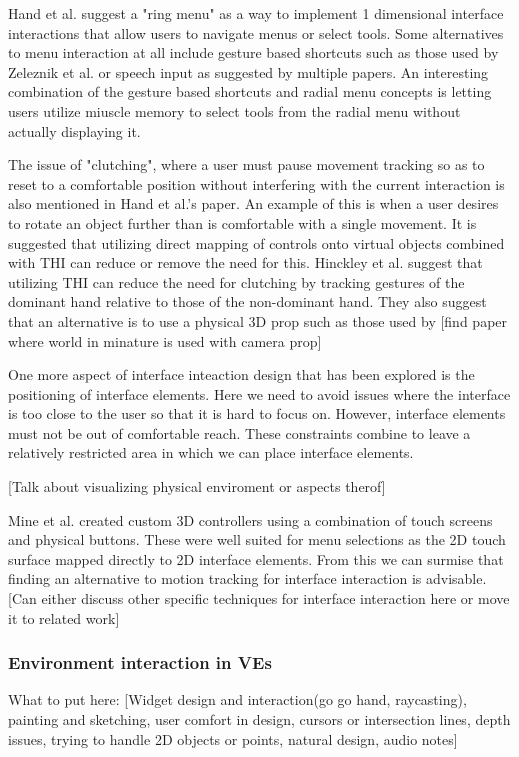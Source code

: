 \documentclass{sig-alternate-05-2015}
\begin{document}
 Hand et al. suggest a "ring menu" as a way to implement 1 dimensional interface interactions that allow users to navigate menus or select tools.\cite{Hand1997} Some alternatives to menu interaction at all include gesture based shortcuts such as those used by Zeleznik et al.\cite{Zeleznik2007} or speech input as suggested by multiple papers. \cite{VanDam1997,Bowman2001,Hand1997} An interesting combination of the gesture based shortcuts and radial menu concepts is letting users utilize miuscle memory to select tools from the radial menu without actually displaying it.\cite{Kurtenbach1993}
 
 The issue of "clutching", where a user must pause movement tracking so as to reset to a comfortable position without interfering with the current interaction is also mentioned in Hand et al.'s paper.\cite{Hand1997} An example of this is when a user desires to rotate an object further than is comfortable with a single movement. It is suggested that utilizing direct mapping of controls onto virtual objects combined with THI can reduce or remove the need for this.\cite{Hand1997}  Hinckley et al. suggest that utilizing THI can reduce the need for clutching by tracking gestures of the dominant hand relative to those of the non-dominant hand.\cite{Hinckley1994} They also suggest that an alternative is to use a physical 3D prop such as those used by [find paper where world in minature is used with camera prop]
 
 One more aspect of interface inteaction design that has been explored is the positioning of interface elements.\cite{alger2015visual} Here we need to avoid issues where the interface is too close to the user so that it is hard to focus on. However, interface elements must not be out of comfortable reach. These constraints combine to leave a relatively restricted area in which we can place interface elements.
 
 [Talk about visualizing physical enviroment or aspects therof] 
 
 Mine et al. created custom 3D controllers using a combination of touch screens and physical buttons.\cite{Mine2014} These were well suited for menu selections as the 2D touch surface mapped directly to 2D interface elements. From this we can surmise that finding an alternative to motion tracking for interface interaction is advisable. [Can either discuss other specific techniques for interface interaction here or move it to related work]
 
 
\subsubsection{Environment interaction in VEs}
What to put here: [Widget design and interaction(go go hand, raycasting), painting and sketching, user comfort in design, cursors or intersection lines, depth issues, trying to handle 2D objects or points, natural design, audio notes]
\end{document}
